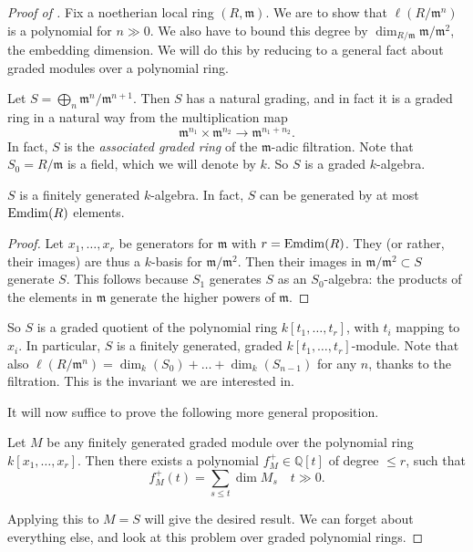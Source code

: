 \begin{proof}[Proof of  ]
Fix a noetherian local ring $(R, \mathfrak{m})$. We are to show that
$\ell(R/\mathfrak{m}^n)$ is a polynomial for $n \gg 0$. We also have to bound
this degree by $\dim_{R/\mathfrak{m}} \mathfrak{m}/\mathfrak{m}^2$, the
embedding dimension. We will do this by reducing to a general fact about
graded modules over a polynomial ring.

Let $S = \bigoplus_n  \mathfrak{m}^n/\mathfrak{m}^{n+1}$. Then $S$ has a
natural grading, and in fact it is a graded ring in a natural way from the
multiplication map 
\[ \mathfrak{m}^{n_1} \times \mathfrak{m}^{n_2} \to \mathfrak{m}^{n_1 + n_2}.  \]
In fact, $S$ is the \emph{associated graded ring} of the $\mathfrak{m}$-adic filtration.
Note that $S_0 = R/\mathfrak{m}$ is a field, which we will denote by  $k$.
So $S$ is a graded $k$-algebra.

\begin{lemma} 
$S$ is a finitely generated $k$-algebra. In fact, $S$ can be generated by at
most $\operatorname{Emdim}(R)$ elements.
\end{lemma} 
\begin{proof} 
Let $x_1, \dots, x_r$ be generators for $\mathfrak{m} $ with $r = \operatorname{Emdim}(R)$.
They  (or rather, their images) are thus a $k$-basis
for $\mathfrak{m}/\mathfrak{m}^2$.
Then their images in $\mathfrak{m}/\mathfrak{m}^2 \subset S$ generate $S$.
This follows because $S_1$ generates $S$ as an $S_0$-algebra: the products of
the elements in $\mathfrak{m}$ generate the higher powers of $\mathfrak{m}$.
\end{proof} 

So $S$ is a graded quotient of the polynomial ring $k[t_1, \dots, t_r]$, with
$t_i $ mapping to $x_i$. In particular, $S$ is a finitely generated, graded $k[t_1,
\dots, t_r]$-module.
Note that also $\ell(R/\mathfrak{m}^n)  = \dim_{k}(S_0) + \dots +
\dim_{k}(S_{n-1})$ for any $n$, thanks to the filtration. This is the
invariant we are interested in.

It will now suffice to prove the following more general proposition.
\begin{proposition} \label{hilbfngeneral}
Let $M$ be any finitely generated graded module over the polynomial ring
$k[x_1, \dots, x_r]$. Then
there exists a polynomial $f_M^+ \in \mathbb{Q}[t]$ of degree $ \leq r$, such that
\[ f_M^+(t) = \sum_{s \leq t} \dim M_s \quad t \gg 0.   \]
\end{proposition} 
Applying this to $M = S$ will give the desired result. We can forget about
everything else, and look at this problem over graded polynomial rings.


\end{proof}
